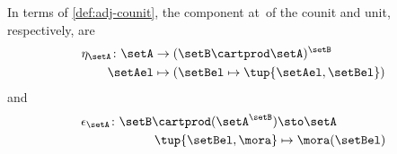 In terms of \cref{def:adj-counit}, the component at~\setA of the counit and unit, respectively, are
\begin{equation}
    \begin{aligned}
        \eta_\setA \colon \setA & \to  (\setB \cartprod \setA)^\setB \\
        \setAel                 & \mapsto (\setBel \mapsto \tup{\setAel,\setBel})
    \end{aligned}
\end{equation}
and
\begin{equation}
    \begin{aligned}
        \epsilon_\setA \colon \setB \cartprod (\setA^\setB) & \sto \setA \\
        \tup{\setBel,\mora}                                 & \mapsto \mora(\setBel)
    \end{aligned}
\end{equation}

